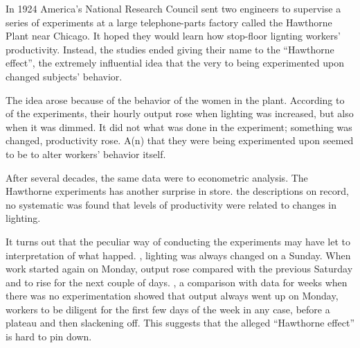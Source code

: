 
\qquad In 1924 America's National Research Council sent two engineers to supervise a series of experiments at a large telephone-parts factory called the Hawthorne Plant near Chicago. It hoped they would learn how stop-floor lignting \underline{\quad} workers' productivity. Instead, the studies ended \underline{\quad} giving their name to the ``Hawthorne effect'', the extremely influential idea that the very \underline{\quad} to being experimented upon changed subjects' behavior.

\qquad The idea arose because of the \underline{\quad} behavior of the women in the plant. According to \underline{\quad} of the experiments, their hourly output rose when lighting was increased, but also when it was dimmed. It did not \underline{\quad} what was done in the experiment; \underline{\quad} something was changed, productivity rose. A(n) \underline{\quad} that they were being experimented upon seemed to be \underline{\quad} to alter workers' behavior \underline{\quad} itself.

\qquad After several decades, the same data were \underline{\quad} to econometric analysis. The Hawthorne experiments has another surprise in store. \underline{\quad} the descriptions on record, no systematic \underline{\quad} was found that levels of productivity were related to changes in lighting.

\qquad It turns out that the peculiar way of conducting the experiments may have let to \underline{\quad} interpretation of what happed. \underline{\quad}, lighting was always changed on a Sunday. When work started again on Monday, output \underline{\quad} rose compared with the previous Saturday and \underline{\quad} to rise for the next couple of days. \underline{\quad}, a comparison with data for weeks when there was no experimentation showed that output always went up on Monday, workers \underline{\quad} to be diligent for the first few days of the week in any case, before \underline{\quad} a plateau and then slackening off. This suggests that the alleged ``Hawthorne effect'' is hard to pin down.

\vspace{6pt}

